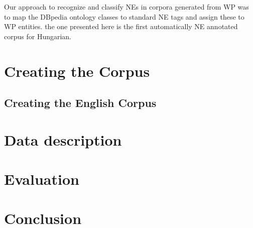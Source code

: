 \documentclass{llncs}
\begin{document}
Our approach to recognize and classify NEs in corpora generated from WP was to
map the DBpedia ontology classes to standard NE tags and assign these to WP
entities. the one presented here is the first automatically NE annotated corpus for Hungarian.

\section{Creating the Corpus}
\subsection{Creating the English Corpus}

\section{Data description}

\section{Evaluation}

\section{Conclusion}

\cite{Nothman:08} \cite{Szarvas:06} \cite{Medelyan:09}

%
%


\end{document}
